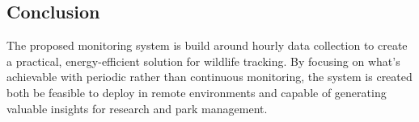 




\subsection{Conclusion}
The proposed monitoring system is build around hourly data collection to create a practical, energy-efficient solution for wildlife tracking. By focusing on what's achievable with periodic rather than continuous monitoring, the system is created both be feasible to deploy in remote environments and capable of generating valuable insights for research and park management.

